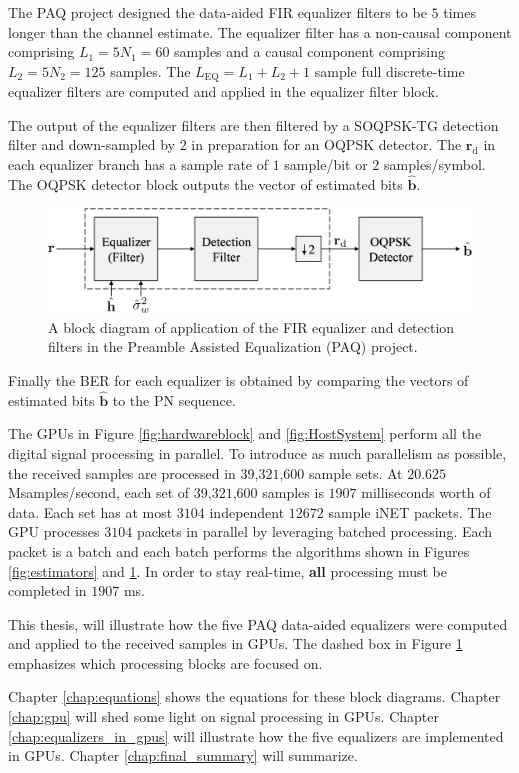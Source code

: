 The PAQ project designed the data-aided FIR equalizer filters to be $5$ times longer than the channel estimate. The equalizer filter has a non-causal component comprising $L_1 = 5N_1 = 60$ samples and a causal component comprising $L_2 = 5N_2 = 125$ samples.
The $L_\text{EQ} = L_1+L_2+1$ sample full discrete-time equalizer filters are computed and applied in the equalizer filter block.

The output of the equalizer filters are then filtered by a SOQPSK-TG detection filter and down-sampled by $2$ in preparation for an OQPSK detector.
The $\mathbf{r}_\text{d}$ in each equalizer branch has a sample rate of $1$ sample/bit or $2$ samples/symbol.
The OQPSK detector block outputs the vector of estimated bits $\hat{\mathbf{b}}$.
\begin{figure}
	\centering\includegraphics[width=8.37in/100*55]{figures/intro/thisThesisBlock.pdf}
	\caption{A block diagram of application of the FIR equalizer and detection filters in the Preamble Assisted Equalization (PAQ) project.}
	\label{fig:thisThesisBlock}
\end{figure}
Finally the BER for each equalizer is obtained by comparing the vectors of estimated bits $\hat{\mathbf{b}}$ to the PN sequence.

The GPUs in Figure \ref{fig:hardwareblock} and \ref{fig:HostSystem} perform all the digital signal processing in parallel.
To introduce as much parallelism as possible, the received samples are processed in $39$,$321$,$600$ sample 		sets. 
At $20.625$ Msamples/second, each set of $39$,$321$,$600$ samples is $1907$ milliseconds worth of data.
Each set has at most $3104$ independent $12672$ sample iNET packets.
The GPU processes $3104$ packets in parallel by leveraging batched processing.
Each packet is a batch and each batch performs the algorithms shown in Figures \ref{fig:estimators} and \ref{fig:thisThesisBlock}.
In order to stay real-time, \textbf{all} processing must be completed in $1907$ ms.

This thesis, will illustrate how the five PAQ data-aided equalizers were computed and applied to the received samples in GPUs.
The dashed box in Figure \ref{fig:thisThesisBlock} emphasizes which processing blocks are focused on.

Chapter \ref{chap:equations} shows the equations for these block diagrams.
Chapter \ref{chap:gpu} will shed some light on signal processing in GPUs.
Chapter \ref{chap:equalizers_in_gpus} will illustrate how the five equalizers are implemented in GPUs.
Chapter \ref{chap:final_summary} will summarize.
